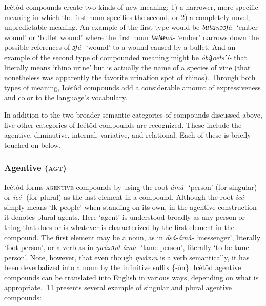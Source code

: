 Icétôd compounds create two kinds of new meaning: 1) a narrower, more specific meaning in which the first noun specifies the second, or 2) a completely novel, unpredictable meaning. An example of the first type would be \textit{bʉbʉnɔɔʝà- }‘ember-wound’ or ‘bullet wound’ where the first noun \textit{bʉbʉná- }‘ember’ narrows down the possible references of \textit{ɔʝá- }‘wound’ to a wound caused by a bullet. And an example of the second type of compounded meaning might be \textit{óbiʝoetsʼí- }that literally means ‘rhino urine’ but is actually the name of a species of vine (that nonetheless was apparently the favorite urination spot of rhinos). Through both types of meaning, Icétôd compounds add a considerable amount of expressiveness and color to the language’s vocabulary.

In addition to the two broader semantic categories of compounds discussed above, five other categories of Icétôd compounds are recognized. These include the agentive, diminutive, internal, variative, and relational. Each of these is briefly touched on below.


\subsubsection{Agentive (\textsc{agt})}

Icétôd forms \textsc{agentive} compounds by using the root \textit{ámá- }‘person’ (for singular) or \textit{icé- }(for plural) as the last element in a compound. Although the root \textit{icé- }simply means ‘Ik people’ when standing on its own, in the agentive construction it denotes plural agents. Here ‘agent’ is understood broadly as any person or thing that does or is whatever is characterized by the first element in the compound. The first element may be a noun, as in \textit{dɛá-ámà- }‘messenger’, literally ‘foot-person’, or a verb as in \textit{ŋwàxɔnɨ-àmà- }‘lame person’, literally ‘to be lame-person’. Note, however, that even though \textit{ŋwàxɔn }is a verb semantically, it has been deverbalized into a noun by the infinitive suffix \{-òn\}. Icétôd agentive compounds can be translated into English in various ways, depending on what is appropriate. .11 presents several example of singular and plural agentive compounds:



